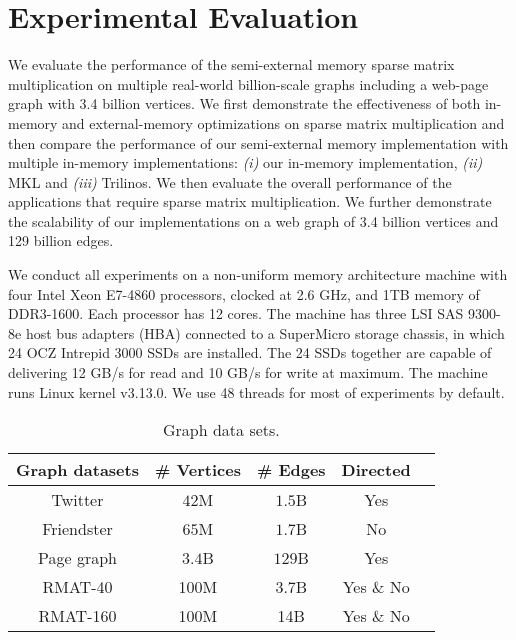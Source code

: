 \section{Experimental Evaluation}

We evaluate the performance of the semi-external memory sparse matrix
multiplication on multiple real-world billion-scale graphs including a web-page
graph with 3.4 billion vertices. We first demonstrate the effectiveness of
both in-memory and external-memory optimizations on sparse matrix multiplication
and then compare the performance of our semi-external memory implementation with
multiple in-memory implementations: \textit{(i)} our in-memory implementation,
\textit{(ii)} MKL and \textit{(iii)} Trilinos. We then evaluate the overall
performance of the applications that require sparse matrix multiplication.
We further demonstrate the scalability of our implementations on a web graph
of 3.4 billion vertices and 129 billion edges.

We conduct all experiments on a non-uniform memory architecture machine with
four Intel Xeon E7-4860 processors, clocked at 2.6 GHz, and 1TB memory of
DDR3-1600. Each processor has 12 cores. The machine has three LSI SAS 9300-8e
host bus adapters (HBA) connected to a SuperMicro storage chassis, in which
24 OCZ Intrepid 3000 SSDs are installed. The 24 SSDs together are capable of
delivering 12 GB/s for read and 10 GB/s for write at maximum. The machine runs
Linux kernel v3.13.0. We use 48 threads for most of experiments by default.

\begin{table}
\begin{center}
\footnotesize
\begin{tabular}{|c|c|c|c|c|}
\hline
Graph datasets & \# Vertices & \# Edges & Directed \\
\hline
Twitter \cite{twitter} & $42$M & $1.5$B & Yes \\
\hline
Friendster \cite{friendster} & $65$M & $1.7$B & No \\
\hline
Page graph \cite{web_graph} & $3.4$B & $129$B & Yes \\
\hline
RMAT-40 \cite{rmat} & 100M & 3.7B & Yes \& No \\
\hline
RMAT-160 \cite{rmat} & 100M & 14B & Yes \& No \\
\hline
\end{tabular}
\normalsize
\end{center}
\caption{Graph data sets.}
\label{graphs}
\end{table}

